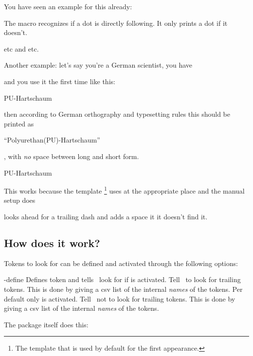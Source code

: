 \documentclass{acro-manual}
\begin{document}
You have seen an example for this already:
\begin{sourcecode}
\end{sourcecode}
The macro  recognizes if a dot is directly following. It only prints
a dot if it doesn't.
\begin{example}
  \ac{etc} and \ac{etc}.
\end{example}

Another example: let's say you're a German scientist, you have
\begin{sourcecode}
\end{sourcecode}
and you use it the first time like this:
\begin{sourcecode}
  \ac{PU}-Hartschaum
\end{sourcecode}
then according to German orthography and typesetting rules this should be
printed as
\begin{center}
  \enquote{Polyurethan(PU)-Hartschaum}
\end{center}
\ie, with \emph{no} space between long and short form.
\begin{example}
  \acf{PU}-Hartschaum
\end{example}

This works because the template \footnote{The template that
  is used by default for the first appearance.} uses  at the
appropriate place and the manual setup does
\begin{sourcecode}
\end{sourcecode}
 looks ahead for a trailing dash and adds a space it it doesn't
find it.

\subsection{How does it work?}
Tokens to look for can be defined and activated through the following options:
\begin{options}
  \keylit-{define}{}
    Defines token  and tells \acro\ look for  if
     is activated.
    Tell \acro\ to look for trailing tokens.  This is done by giving a csv
    list of the internal \emph{names} of the tokens.  Per default only
     is activated.
    Tell \acro\ not to look for trailing tokens.  This is done by giving a csv
    list of the internal \emph{names} of the tokens.
\end{options}
The package itself does this:
\begin{sourcecode}
\end{sourcecode}
\end{document}
